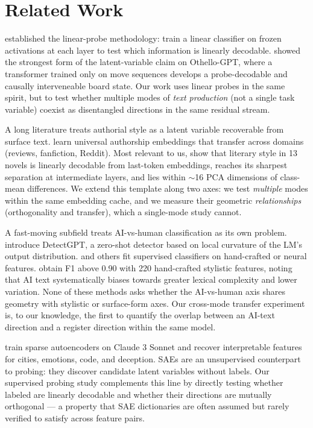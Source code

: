 \section{Related Work}
\label{sec:related}

 \citet{alain2016linear} established the linear-probe methodology: train a linear classifier on frozen activations at each layer to test which information is linearly decodable. \citet{li2022emergent} showed the strongest form of the latent-variable claim on Othello-GPT, where a transformer trained only on move sequences develops a probe-decodable and causally interveneable board state. Our work uses linear probes in the same spirit, but to test whether multiple modes of \emph{text production} (not a single task variable) coexist as disentangled directions in the same residual stream.

 A long literature treats authorial style as a latent variable recoverable from surface text. \citet{rivera2021universal} learn universal authorship embeddings that transfer across domains (reviews, fanfiction, Reddit). Most relevant to us, \citet{sarfati2025prompt} show that literary style in 13 novels is linearly decodable from \llama last-token embeddings, reaches its sharpest separation at intermediate layers, and lies within $\sim$16 PCA dimensions of class-mean differences. We extend this template along two axes: we test \emph{multiple} modes within the same embedding cache, and we measure their geometric \emph{relationships} (orthogonality and transfer), which a single-mode study cannot.

 A fast-moving subfield treats AI-vs-human classification as its own problem. \citet{mitchell2023detectgpt} introduce DetectGPT, a zero-shot detector based on local curvature of the LM's output distribution. \citet{verma2023ghostbuster} and others fit supervised classifiers on hand-crafted or neural features. \citet{schafer2025stylistic} obtain F1 above 0.90 with 220 hand-crafted stylistic features, noting that AI text systematically biases towards greater lexical complexity and lower variation. None of these methods asks whether the AI-vs-human axis shares geometry with stylistic or surface-form axes. Our cross-mode transfer experiment is, to our knowledge, the first to quantify the overlap between an AI-text direction and a register direction within the same model.

 \citet{templeton2024scaling} train sparse autoencoders on Claude 3 Sonnet and recover interpretable features for cities, emotions, code, and deception. SAEs are an unsupervised counterpart to probing: they discover candidate latent variables without labels. Our supervised probing study complements this line by directly testing whether labeled \modes are linearly decodable and whether their directions are mutually orthogonal --- a property that SAE dictionaries are often assumed but rarely verified to satisfy across feature pairs.

